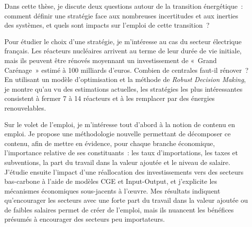 Dans cette thèse, je discute deux questions autour de la transition énergétique : comment définir une stratégie face aux nombreuses incertitudes et aux inerties des systèmes, et quels sont impacts sur l’emploi de cette transition ?

Pour étudier le choix d’une stratégie, je m’intéresse au cas du secteur électrique français. Les réacteurs nucléaires arrivent au terme de leur durée de vie initiale, mais ils peuvent être rénovés moyennant un investissement de « Grand Carénage » estimé à 100 milliards d'euros. Combien de centrales faut-il rénover ? En utilisant un modèle d'optimisation et la méthode de \textit{Robust Decision Making}, je montre qu’au vu des estimations actuelles, les stratégies les plus intéressantes consistent à fermer 7 à 14 réacteurs et à les remplacer par des énergies renouvelables.

Sur le volet de l’emploi, je m’intéresse tout d’abord à la notion de contenu en emploi. Je propose une méthodologie nouvelle permettant de décomposer ce contenu, afin de mettre en évidence, pour chaque branche économique, l’importance relative de ses constituants : les taux d’importations, les taxes et subventions, la part du travail dans la valeur ajoutée et le niveau de salaire. 
J'étudie ensuite l’impact d’une réallocation des investissements vers des secteurs bas-carbone à l'aide de modèles CGE et Input-Output, et j'explicite les mécanismes économiques sous-jacents à l'\oe{}uvre. 
Mes résultats indiquent qu'encourager les secteurs avec une forte part du travail dans la valeur ajoutée ou de faibles salaires permet de créer de l'emploi, mais ils nuancent les bénéfices présumés à encourager des secteurs peu importateurs.


